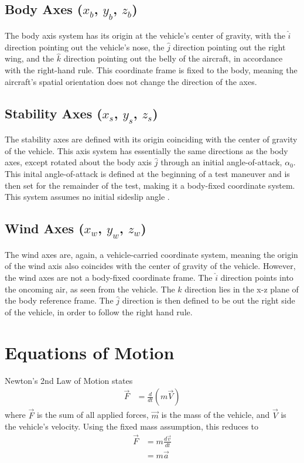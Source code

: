 \subsection*{Body Axes ($x_b$, $y_b$, $z_b$)}
The body axis system has its origin at the vehicle's center of gravity, with the $\hat{i}$ direction pointing out the vehicle's nose, the $\hat{j}$ direction pointing out the right wing, and the $\hat{k}$ direction pointing out the belly of the aircraft, in accordance with the right-hand rule. This coordinate frame is fixed to the body, meaning the aircraft's spatial orientation does not change the direction of the axes.

\subsection*{Stability Axes ($x_s$, $y_s$, $z_s$)}
The stability axes are defined with its origin coinciding with the center of gravity of the vehicle. This axis system has essentially the same directions as the body axes, except rotated about the body axis $\hat{j}$ through an initial angle-of-attack, $\alpha_{0}$. This inital angle-of-attack is defined at the beginning of a test maneuver and is then set for the remainder of the test, making it a body-fixed coordinate system. This system assumes no initial sideslip angle \cite{roskam2001airplane}.

\subsection*{Wind Axes ($x_w$, $y_w$, $z_w$)}
The wind axes are, again, a vehicle-carried coordinate system, meaning the origin of the wind axis also coincides with the center of gravity of the vehicle. However, the wind axes are not a body-fixed coordinate frame. The $\hat{i}$ direction points into the oncoming air, as seen from the vehicle. The $\hat{k}$ direction lies in the x-z plane of the body reference frame. The $\hat{j}$ direction is then defined to be out the right side of the vehicle, in order to follow the right hand rule. 

\section{Equations of Motion}
\label{sys-desc}
Newton's 2nd Law of Motion states
\begin{align}
\vec{F} &= \frac{d}{dt}(m\vec{V})
\end{align}
where $\vec{F}$ is the sum of all applied forces, $\vec{m}$ is the mass of the vehicle, and $\vec{V}$ is the vehicle's velocity. Using the fixed mass assumption, this reduces to 
\begin{align}
\vec{F} &= m\frac{d\vec{v}}{dt}\\
&= m\vec{a}
\end{align}

